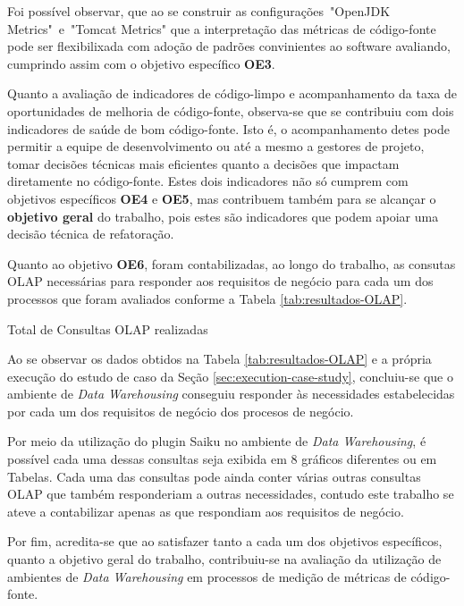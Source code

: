 Foi possível observar, que ao se construir as configurações~"OpenJDK Metrics"~e~"Tomcat Metrics" que a interpretação das métricas de código-fonte pode ser flexibilixada com adoção de padrões convinientes ao software avaliando, cumprindo assim com o objetivo específico \textbf{OE3}.

Quanto a avaliação de indicadores de código-limpo e acompanhamento da taxa de oportunidades de melhoria de código-fonte, observa-se que se contribuiu com dois indicadores de saúde de bom código-fonte. Isto é, o acompanhamento detes pode permitir a equipe de desenvolvimento ou até a mesmo a gestores de projeto, tomar decisões técnicas mais eficientes quanto a decisões que impactam diretamente no código-fonte. Estes dois indicadores não só cumprem com objetivos específicos \textbf{OE4} e \textbf{OE5}, mas contribuem também para se alcançar o \textbf{objetivo geral} do trabalho, pois estes são indicadores que podem apoiar uma decisão técnica de refatoração.

Quanto ao objetivo \textbf{OE6}, foram contabilizadas, ao longo do trabalho, as consutas OLAP necessárias para responder aos requisitos de negócio para cada um dos processos que foram avaliados conforme a Tabela \ref{tab:resultados-OLAP}.

 
\begin{table}[H]
\begin{center}

\caption{Total de Consultas OLAP realizadas}
\label{tab:resultados-OLAP}
\end{center}
\end{table}
\FloatBarrier


Ao se observar os dados obtidos na Tabela \ref{tab:resultados-OLAP} e a própria execução do estudo de caso da Seção \ref{sec:execution-case-study}, concluiu-se que o ambiente de \textit{Data Warehousing} conseguiu responder às necessidades estabelecidas por cada um dos requisitos de negócio dos procesos de negócio. 

Por meio da utilização do plugin Saiku no ambiente de \textit{Data Warehousing}, é possível cada uma dessas consultas seja exibida em 8 gráficos diferentes ou em Tabelas. Cada uma das consultas pode ainda conter várias outras consultas OLAP que também responderiam a outras necessidades, contudo este trabalho se ateve a contabilizar apenas as que respondiam aos requisitos de negócio.

Por fim, acredita-se que ao satisfazer tanto a cada um dos objetivos específicos, quanto a objetivo geral do trabalho, contribuiu-se na avaliação da utilização de ambientes de \textit{Data Warehousing} em processos de medição de métricas de código-fonte. 

